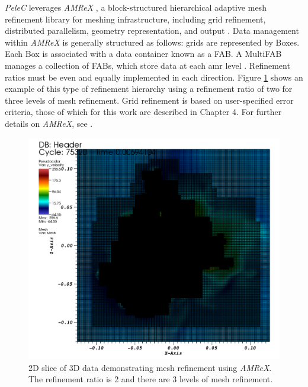 \textit{PeleC} leverages \textit{AMReX} \cite{amrex1, amrex2, amrex3}, a block-structured hierarchical adaptive mesh refinement library for meshing infrastructure, including grid refinement, distributed parallelism, geometry representation, and output \cite{PeleC1}. Data management within \textit{AMReX} is generally structured as follows: grids are represented by Boxes. Each Box is associated with a data container known as a FAB. A MultiFAB manages a collection of FABs, which store data at each \gls{amr} level \cite{PeleC1}. Refinement ratios must be even and equally implemented in each direction. Figure \ref{amr_ex} shows an example of this type of refinement hierarchy using a refinement ratio of two for three levels of mesh refinement. Grid refinement is based on user-specified error criteria, those of which for this work are described in Chapter 4. For further details on \textit{AMReX}, see \cite{amrex1}. 

\begin{figure}[h!]
\begin{center}
	\includegraphics[scale=.3]{figures/amr_example.png}
	\caption{2D slice of 3D data demonstrating mesh refinement using \textit{AMReX}. The refinement ratio is 2 and there are 3 levels of mesh refinement.} \label{amr_ex}
\end{center}
\end{figure}

